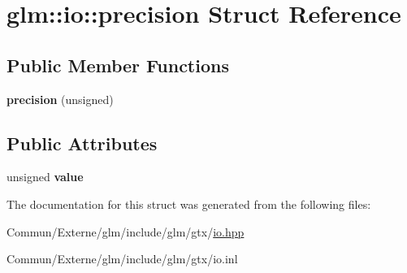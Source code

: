 \hypertarget{structglm_1_1io_1_1precision}{}\section{glm\+:\+:io\+:\+:precision Struct Reference}
\label{structglm_1_1io_1_1precision}
\subsection*{Public Member Functions}
\begin{DoxyCompactItemize}
\item 
{\bfseries precision} (unsigned)\hypertarget{structglm_1_1io_1_1precision_aa359e1766fd74b88e049d5449d521447}{}\label{structglm_1_1io_1_1precision_aa359e1766fd74b88e049d5449d521447}

\end{DoxyCompactItemize}
\subsection*{Public Attributes}
\begin{DoxyCompactItemize}
\item 
unsigned {\bfseries value}\hypertarget{structglm_1_1io_1_1precision_a43da772dff9a209768c63f1220d52074}{}\label{structglm_1_1io_1_1precision_a43da772dff9a209768c63f1220d52074}

\end{DoxyCompactItemize}


The documentation for this struct was generated from the following files\+:\begin{DoxyCompactItemize}
\item 
Commun/\+Externe/glm/include/glm/gtx/\hyperlink{io_8hpp}{io.\+hpp}\item 
Commun/\+Externe/glm/include/glm/gtx/io.\+inl\end{DoxyCompactItemize}
